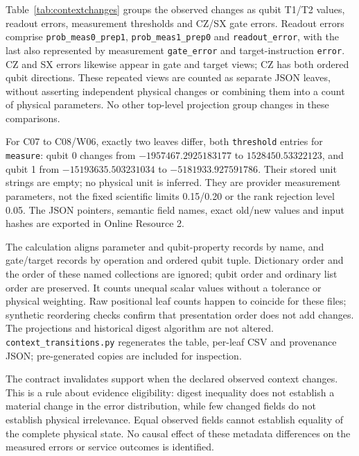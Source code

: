 \documentclass[11pt,a4paper]{article}
\begin{document}
Table~\ref{tab:contextchanges} groups the observed changes as qubit T1/T2 values, readout errors, measurement thresholds and CZ/SX gate errors. Readout errors comprise \texttt{prob\_meas0\_prep1}, \texttt{prob\_meas1\_prep0} and \texttt{readout\_error}, with the last also represented by measurement \texttt{gate\_error} and target-instruction \texttt{error}. CZ and SX errors likewise appear in gate and target views; CZ has both ordered qubit directions. These repeated views are counted as separate JSON leaves, without asserting independent physical changes or combining them into a count of physical parameters. No other top-level projection group changes in these comparisons.

For C07 to C08/W06, exactly two leaves differ, both \texttt{threshold} entries for \texttt{measure}: qubit 0 changes from $-1957467.2925183177$ to $1528450.53322123$, and qubit 1 from $-15193635.503231034$ to $-5181933.927591786$. Their stored unit strings are empty; no physical unit is inferred. They are provider measurement parameters, not the fixed scientific limits 0.15/0.20 or the rank rejection level 0.05. The JSON pointers, semantic field names, exact old/new values and input hashes are exported in Online Resource 2.

The calculation aligns parameter and qubit-property records by name, and gate/target records by operation and ordered qubit tuple. Dictionary order and the order of these named collections are ignored; qubit order and ordinary list order are preserved. It counts unequal scalar values without a tolerance or physical weighting. Raw positional leaf counts happen to coincide for these files; synthetic reordering checks confirm that presentation order does not add changes. The projections and historical digest algorithm are not altered. \texttt{context\_transitions.py} regenerates the table, per-leaf CSV and provenance JSON; pre-generated copies are included for inspection.

The contract invalidates support when the declared observed context changes. This is a rule about evidence eligibility: digest inequality does not establish a material change in the error distribution, while few changed fields do not establish physical irrelevance. Equal observed fields cannot establish equality of the complete physical state. No causal effect of these metadata differences on the measured errors or service outcomes is identified.

{

}
\end{document}
